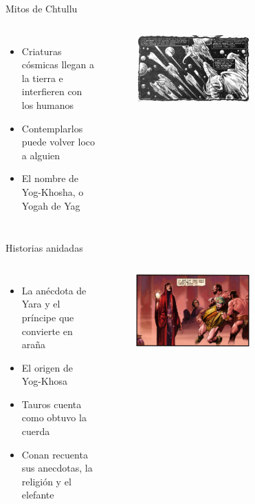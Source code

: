 \begin{frame}{Mitos de Chtullu}
\begin{columns}
 \begin{itemize}
    \item Criaturas cósmicas llegan a la tierra e interfieren con los humanos
    \item Contemplarlos puede volver loco a alguien
    \item El nombre de Yog-Khosha, o Yogah de Yag
 \end{itemize}
    \begin{figure}[htb]
      \centering
      \includegraphics[width=0.6\textwidth]{img/tropes/mitos}
    \end{figure} 
  \end{columns} 
\end{frame}

\begin{frame}{Historias anidadas}
\begin{columns}
 \begin{itemize}
    \item La anécdota de Yara y el príncipe que convierte en araña
    \item El origen de Yog-Khosa
    \item Tauros cuenta como obtuvo la cuerda
    \item Conan recuenta sus anecdotas, la religión y el elefante
 \end{itemize}
    \begin{figure}[htb]
      \centering
      \includegraphics[width=0.6\textwidth]{img/tropes/historias}
    \end{figure} 
  \end{columns} 
\end{frame}

